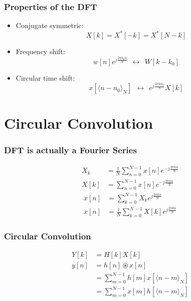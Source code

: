 \documentclass{beamer}
\begin{document}
\begin{frame}
  \frametitle{Properties of the DFT}

  \begin{itemize}
  \item Conjugate symmetric:
    \begin{displaymath}
      X[k] = X^*[-k] = X^*[N-k]
    \end{displaymath}
  \item Frequency shift:
    \begin{displaymath}
      w[n]e^{j\frac{2\pi k_0 n}{N}} ~~\leftrightarrow~~W[k-k_0]
    \end{displaymath}
  \item Circular time shift:
    \begin{displaymath}
      x\left[\langle n-n_0\rangle_N\right]~~\leftrightarrow~~e^{j\frac{2\pi kn_0}{N}}X[k]
    \end{displaymath}
  \end{itemize}
\end{frame}  

\section[Circular Convolution]{Circular Convolution}
\setcounter{subsection}{1}

\begin{frame}
  \frametitle{DFT is actually a Fourier Series}

  \begin{align*}
    X_k &=  \frac{1}{N}\sum_{n=0}^{N-1} x[n]e^{-j\frac{2\pi kn}{N}}\\
    X[k] &= \sum_{n=0}^{N-1} x[n]e^{-j\frac{2\pi kn}{N}}
  \end{align*}
  \begin{align*}
    x[n] &= \sum_{k=0}^{N-1} X_ke^{j\frac{2\pi kn}{N}}\\
    x[n] &= \frac{1}{N}\sum_{k=0}^{N-1} X[k]e^{j\frac{2\pi kn}{N}}
  \end{align*}
\end{frame}

\begin{frame}
  \frametitle{Circular Convolution}

  \begin{align*}
    Y[k] &= H[k]X[k]\\
    y[n] &= h[n] \circledast x[n] \\
    &= \sum_{m=0}^{N-1}h\left[m\right] x\left[\langle n-m\rangle_N\right]\\
    &= \sum_{m=0}^{N-1}x\left[m\right] h\left[\langle n-m\rangle_N\right]
  \end{align*}
\end{frame}
\end{document}

